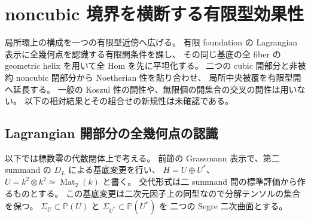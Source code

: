 \section{noncubic 境界を横断する有限型効果性}
\label{sec:noncubic-finite-type}

局所環上の構成を一つの有限型近傍へ広げる。
有限 foundation の Lagrangian 表示に全幾何点を認識する有限開条件を課し、
その同じ基底の全 fiber の geometric helix を用いて全 Hom を先に平坦化する。
二つの cubic 開部分と非被約 noncubic 閉部分から Noetherian 性を貼り合わせ、
局所中央被覆を有限型開へ延長する。
一般の Koszul 性の開性や、無限個の開集合の交叉の開性は用いない。
以下の相対結果とその組合せの新規性は未確認である。

\subsection{Lagrangian 開部分の全幾何点の認識}

以下では標数零の代数閉体上で考える。
前節の Grassmann 表示で、第二 summand の $D_L$ による基底変更を行い、
$H=U\oplus U^*$、$U=k^2\otimes k^2\simeq\operatorname{Mat}_2(k)$ と書く。
交代形式は二 summand 間の標準評価から作るものとする。
この基底変更は二次元因子上の同型なので分解テンソルの集合を保つ。
$\Sigma_U\subset\mathbb P(U)$ と $\Sigma_{U^*}\subset\mathbb P(U^*)$ を
二つの Segre 二次曲面とする。

